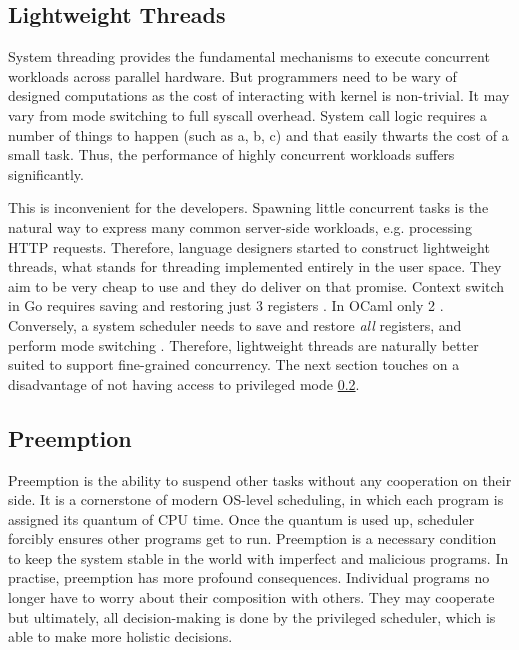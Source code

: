 \documentclass[12pt,a4paper,twoside]{report}
\begin{document}
\subsection{Lightweight Threads}
\label{section:lightweight-threads}
System threading provides the fundamental mechanisms to execute concurrent workloads across parallel hardware. But programmers need to be wary of designed computations as the cost of interacting with kernel is non-trivial. It may vary from mode switching to full syscall overhead. System call logic requires a number of things to happen (such as a, b, c) and that easily thwarts the cost of a small task. Thus, the performance of highly concurrent workloads suffers significantly.

This is inconvenient for the developers. Spawning little concurrent tasks is the natural way to express many common server-side workloads, e.g. processing HTTP requests. Therefore, language designers started to construct lightweight threads, what stands for threading implemented entirely in the user space. They aim to be very cheap to use and they do deliver on that promise. Context switch in Go requires saving and restoring just 3 registers \cite{gorout_vs_os_thread}. In OCaml only 2 \cite{Sivaramakrishnan2021}. Conversely, a system scheduler needs to save and restore \textit{all} registers, and perform mode switching \cite{gorout_vs_os_thread}. Therefore, lightweight threads are naturally better suited to support fine-grained concurrency. The next section touches on a disadvantage of not having access to privileged mode \ref{section:preemption}. 

\subsection{Preemption}
\label{section:preemption}

Preemption is the ability to suspend other tasks without any cooperation on their side. It is a cornerstone of modern OS-level scheduling, in which each program is assigned its quantum of CPU time. Once the quantum is used up, scheduler forcibly ensures other programs get to run. Preemption is a necessary condition to keep the system stable in the world with imperfect and malicious programs. In practise, preemption has more profound consequences. Individual programs no longer have to worry about their composition with others. They may cooperate but ultimately, all decision-making is done by the privileged scheduler, which is able to make more holistic decisions. 
\end{document}

